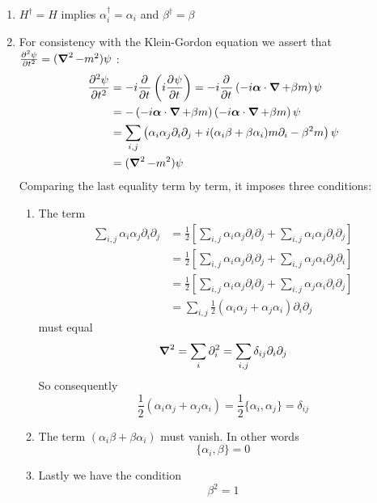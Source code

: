 \begin{enumerate}
\item $H^\dagger = H$ implies $\alpha^\dagger_i = \alpha_i$ and $\beta^\dagger = \beta$
\item For consistency with the Klein-Gordon equation we assert that $\pd[2]{\psi}{t} = (\vnabla^2 - m^2)\psi$ :
\begin{align*} \pd[2]{\psi}{t} &= -i \pd{}{t}\left(i \pd{\psi}{t}\right) = -i \pd{}{t}\left(-i \vec{\alpha}\cdot \vnabla + \beta m\right)\psi \\
&= - \left(-i \vec{\alpha}\cdot \vnabla + \beta m\right)\left(-i \vec{\alpha}\cdot \vnabla + \beta m\right)\psi \\
&= \sum_{i,j}\left(\alpha_i\alpha_j\partial_i\partial_j + i (\alpha_i\beta + \beta \alpha_i)m\partial_i - \beta^2 m \right)\psi \\
&= (\vnabla^2 - m^2)\psi
\end{align*}
Comparing the last equality term by term, it imposes three conditions:
\begin{enumerate}
\item The term 
\begin{align*}
\sum_{i,j}\alpha_i\alpha_j\partial_i\partial_j &= \frac{1}{2}\left[\sum_{i,j}\alpha_i\alpha_j\partial_i\partial_j + \sum_{i,j}\alpha_i\alpha_j\partial_i\partial_j\right] \\
&= \frac{1}{2}\left[\sum_{i,j}\alpha_i\alpha_j\partial_i\partial_j + \sum_{i,j}\alpha_j\alpha_i\partial_j\partial_i\right] \\
&= \frac{1}{2}\left[\sum_{i,j}\alpha_i\alpha_j\partial_i\partial_j + \sum_{i,j}\alpha_j\alpha_i\partial_i\partial_j\right] \\
&= \sum_{i,j}\frac{1}{2}\left(\alpha_i\alpha_j + \alpha_j\alpha_i\right)\partial_i\partial_j
\end{align*}
 must equal
\begin{align*}
 \vnabla^2 = \sum_i \partial_i^2 = \sum_{i,j} \delta_{ij}\partial_i\partial_j
\end{align*}
So consequently
\[ \frac{1}{2}\left(\alpha_i\alpha_j + \alpha_j\alpha_i\right) = \frac{1}{2}\{\alpha_i, \alpha_j\} = \delta_{ij} \]
\item The term $(\alpha_i \beta + \beta \alpha_i)$ must vanish. In other words
 \[ \{ \alpha_i, \beta \} = 0\]
\item Lastly we have the condition
\[\beta^2 = 1\]
\end{enumerate}
\end{enumerate}

